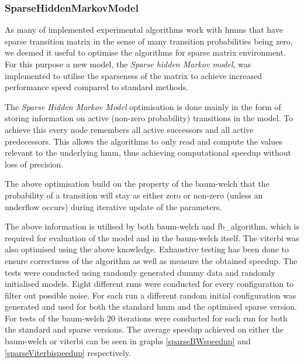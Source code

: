 \subsubsection{SparseHiddenMarkovModel}
\label{sec:shmm}

As many of implemented experimental algorithms work with \glspl{hmm} that have sparse transition matrix in the sense of many transition probabilities being zero, we deemed it useful to optimise the algorithms for sparse matrix environment. For this purpose a new model, the \emph{Sparse hidden Markov model}, was implemented to utilise the sparseness of the matrix to achieve increased performance speed compared to standard methods.

The \emph{Sparse Hidden Markov Model} optimisation is done mainly in the form of storing information on active (non-zero probability) transitions in the model. To achieve this every node remembers all active successors and all active predecessors. This allows the algorithms to only read and compute the values relevant to the underlying \gls{hmm}, thus achieving computational speedup without loss of precision.

The above optimisation build on the property of the \gls{baum-welch} that the probability of a transition will stay as either zero or non-zero (unless an underflow occurs) during iterative update of the parameters.

The above information is utilised by both \gls{baum-welch} and \gls{fb_algorithm}, which is required for evaluation of the model and in the \gls{baum-welch} itself. The \gls{viterbi} was also optimised using the above knowledge. Exhaustive testing has been done to ensure correctness of the algorithm as well as measure the obtained speedup. The tests were conducted using randomly generated dummy data and randomly initialised models. Eight different runs were conducted for every configuration to filter out possible noise. For each run a different random initial configuration was generated and used for both the standard \gls{hmm} and the optimised sparse version. For tests of the \gls{baum-welch} $20$ iterations were conducted for each run for both the standard and sparse versions. The average speedup achieved on either the \gls{baum-welch} or \gls{viterbi} can be seen in graphs \ref{sparseBWspeedup} and \ref{sparseViterbispeedup} respectively.

